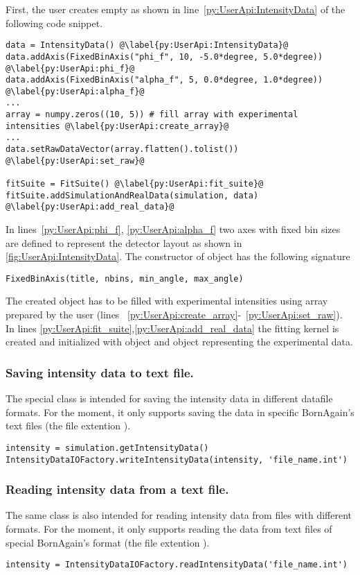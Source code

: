 First, the user creates empty  as shown
in line~\ref{py:UserApi:IntensityData} of the following code snippet.
\begin{lstlisting}
data = IntensityData() @\label{py:UserApi:IntensityData}@
data.addAxis(FixedBinAxis("phi_f", 10, -5.0*degree, 5.0*degree)) @\label{py:UserApi:phi_f}@
data.addAxis(FixedBinAxis("alpha_f", 5, 0.0*degree, 1.0*degree)) @\label{py:UserApi:alpha_f}@
...
array = numpy.zeros((10, 5)) # fill array with experimental intensities @\label{py:UserApi:create_array}@
...
data.setRawDataVector(array.flatten().tolist()) @\label{py:UserApi:set_raw}@

fitSuite = FitSuite() @\label{py:UserApi:fit_suite}@
fitSuite.addSimulationAndRealData(simulation, data) @\label{py:UserApi:add_real_data}@
\end{lstlisting}

In lines~\ref{py:UserApi:phi_f}, \ref{py:UserApi:alpha_f} two axes with fixed bin sizes
are defined to represent the detector layout as shown in \cref{fig:UserApi:IntensityData}.
The constructor of  object has the following signature

\begin{lstlisting}
FixedBinAxis(title, nbins, min_angle, max_angle)
\end{lstlisting}

The created  object has to be filled with experimental intensities
using  array prepared by the user (lines ~\ref{py:UserApi:create_array}-~\ref{py:UserApi:set_raw}). In lines \ref{py:UserApi:fit_suite},\ref{py:UserApi:add_real_data} the fitting kernel is created and initialized with  object and
 object representing the experimental data.


\subsubsection{Saving intensity data to text file.}

The special class  is intended for saving the intensity data
in different datafile formats. For the moment, it only supports saving the data in specific BornAgain's text files (the file extention ).

\begin{lstlisting}
intensity = simulation.getIntensityData()
IntensityDataIOFactory.writeIntensityData(intensity, 'file_name.int')
\end{lstlisting}

\subsubsection{Reading intensity data from a text file.}
The same class is also intended for reading intensity data
from files with different formats. For the moment, it only supports reading the data from text files of special BornAgain's format (the file extention ).

\begin{lstlisting}
intensity = IntensityDataIOFactory.readIntensityData('file_name.int')
\end{lstlisting}
\fi
